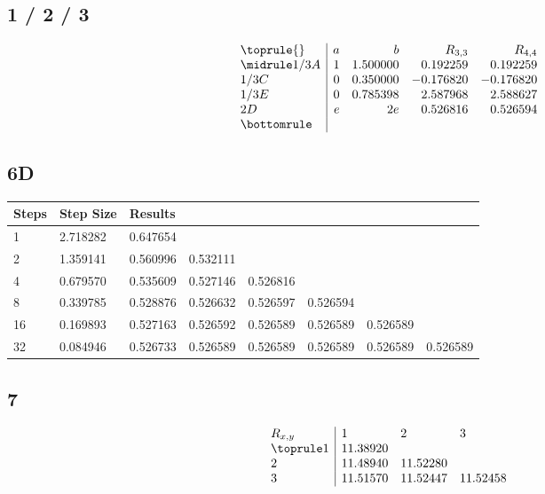 \documentclass{oisinclass}
\begin{document}
\subsection*{1 / 2 / 3}
\[
	\begin{array}{l|rrrr}
		\toprule
		{}   & a & b        & R_{3,3}   & R_{4,4}   \\
		\midrule
		1/3A & 1 & 1.500000 & 0.192259  & 0.192259  \\
		1/3C & 0 & 0.350000 & -0.176820 & -0.176820 \\
		1/3E & 0 & 0.785398 & 2.587968  & 2.588627  \\
		2D   & e & 2e       & 0.526816  & 0.526594  \\
		\bottomrule
	\end{array}
\]

\subsection*{6D}
\begin{tabular}{llllllll}
	\textbf{Steps} & \textbf{Step Size} & \textbf{Results} &          &          &          &          &          \\
	\toprule
	1              & 2.718282           & 0.647654         &          &          &          &          &          \\
	2              & 1.359141           & 0.560996         & 0.532111 &          &          &          &          \\
	4              & 0.679570           & 0.535609         & 0.527146 & 0.526816 &          &          &          \\
	8              & 0.339785           & 0.528876         & 0.526632 & 0.526597 & 0.526594 &          &          \\
	16             & 0.169893           & 0.527163         & 0.526592 & 0.526589 & 0.526589 & 0.526589 &          \\
	32             & 0.084946           & 0.526733         & 0.526589 & 0.526589 & 0.526589 & 0.526589 & 0.526589
\end{tabular}

\subsection*{7}
\[
	\begin{array}{l|lll}
		R_{x, y} & 1        & 2        & 3        \\
		\toprule
		1        & 11.38920 &          &          \\
		2        & 11.48940 & 11.52280 &          \\
		3        & 11.51570 & 11.52447 & 11.52458
	\end{array}
\]
\end{document}
